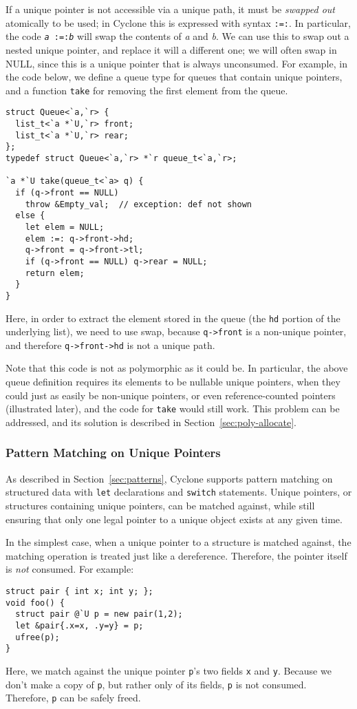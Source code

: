 If a unique pointer is not accessible via a unique path, it must be
\emph{swapped out} atomically to be used; in Cyclone this is expressed with
syntax \texttt{:=:}.  In particular, the code \texttt{{\it a} :=:{\it b}}
will swap the contents of {\it a} and {\it b}.  We can use this to swap out
a nested unique pointer, and replace it will a different one; we will often
swap in NULL, since this is a unique pointer that is always unconsumed.  For
example, in the code below, we define a queue type for queues that contain
unique pointers, and a function \texttt{take} for removing the first element
from the queue.
\begin{verbatim}
struct Queue<`a,`r> { 
  list_t<`a *`U,`r> front; 
  list_t<`a *`U,`r> rear; 
};
typedef struct Queue<`a,`r> *`r queue_t<`a,`r>;

`a *`U take(queue_t<`a> q) {
  if (q->front == NULL)
    throw &Empty_val;  // exception: def not shown
  else {
    let elem = NULL;
    elem :=: q->front->hd;
    q->front = q->front->tl;
    if (q->front == NULL) q->rear = NULL;
    return elem;
  }
}
\end{verbatim}
Here, in order to extract the element stored in the queue (the \texttt{hd}
portion of the underlying list), we need to use swap, because
\texttt{q->front} is a non-unique pointer, and therefore
\texttt{q->front->hd} is not a unique path.

Note that this code is not as polymorphic as it could be.  In particular,
the above queue definition requires its elements to be nullable unique
pointers, when they could just as easily be non-unique pointers, or even
reference-counted pointers (illustrated later), and the code for
\texttt{take} would still work.  This problem can be addressed, and its
solution is described in Section~\ref{sec:poly-allocate}.

\subsubsection{Pattern Matching on Unique Pointers}
\label{sec:unique-patterns}

As described in Section~\ref{sec:patterns}, Cyclone supports pattern
matching on structured data with \texttt{let} declarations and
\texttt{switch} statements.  Unique pointers, or structures containing
unique pointers, can be matched against, while still ensuring that only one
legal pointer to a unique object exists at any given time.

In the simplest case, when a unique pointer to a structure is matched
against, the matching operation is treated just like a dereference.
Therefore, the pointer itself is \emph{not} consumed.  For example:
\begin{verbatim}
struct pair { int x; int y; };
void foo() {
  struct pair @`U p = new pair(1,2);
  let &pair{.x=x, .y=y} = p;
  ufree(p);
}
\end{verbatim}
Here, we match against the unique pointer \texttt{p}'s two fields
\texttt{x} and \texttt{y}.  Because we don't make a copy of \texttt{p}, but
rather only of its fields, \texttt{p} is not consumed.  Therefore,
\texttt{p} can be safely freed.


